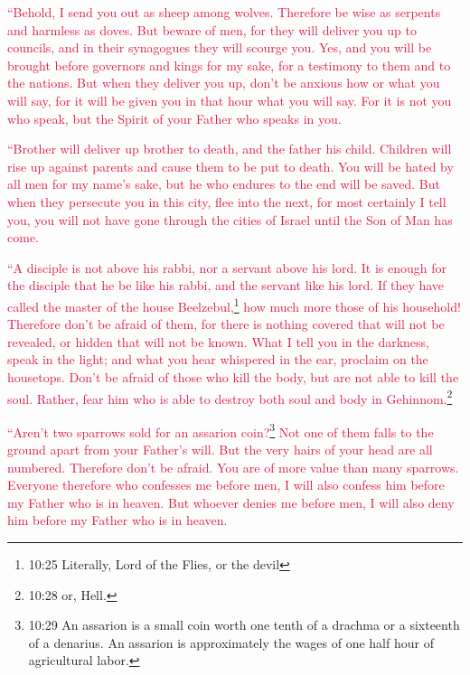 \myverse{}\textcolor{crimson}{“Behold, I send you out as sheep among wolves. Therefore be wise as serpents and harmless as doves.} \myverse{}\textcolor{crimson}{But beware of men, for they will deliver you up to councils, and in their synagogues they will scourge you.} \myverse{}\textcolor{crimson}{Yes, and you will be brought before governors and kings for my sake,
	for a testimony to them and to the nations.
}
\myverse{}\textcolor{crimson}{But when they deliver you up, don’t be anxious how or what you will say,
	for it will be given you in that hour what you will say.
}
\myverse{}\textcolor{crimson}{For it is not you who speak, but the Spirit of your Father who speaks
	in you.}

\myverse{}\textcolor{crimson}{“Brother will deliver up brother to death, and the father
	his child. Children will rise up against parents and cause them to be put to death.
}
\myverse{}\textcolor{crimson}{You will be hated by all men for my name’s sake, but he who endures to
	the end will be saved.
}
\myverse{}\textcolor{crimson}{But when they persecute you in this city, flee into the next, for most
	certainly I tell you, you will not have gone through the cities of Israel until the Son of Man has come.}

\myverse{}\textcolor{crimson}{“A disciple is not above his rabbi, nor a servant above
	his lord.
}
\myverse{}\textcolor{crimson}{It is enough for the disciple that he be like his rabbi, and the servant
	like his lord. If they have called the master of the house Beelzebul,}\footnote{10:25 Literally, Lord of the Flies, or the devil}
\textcolor{crimson}{how much more those of his household!
}
\myverse{}\textcolor{crimson}{Therefore don’t be afraid of them, for there is nothing covered that
	will not be revealed, or hidden that will not be known.
}
\myverse{}\textcolor{crimson}{What I tell you in the darkness, speak in the light; and what you hear
	whispered in the ear, proclaim on the housetops.
}
\myverse{}\textcolor{crimson}{Don’t be afraid of those who kill the body, but are not able to kill
	the soul. Rather, fear him who is able to destroy both soul and body in Gehinnom.}\footnote{10:28 or, Hell.}

\myverse{}\textcolor{crimson}{“Aren’t two sparrows sold for an assarion coin?}\footnote{10:29 An assarion is a small coin worth one tenth of a drachma or a sixteenth of a denarius. An assarion
	is approximately the wages of one half hour of agricultural labor.}
\textcolor{crimson}{Not one of them falls to the ground apart from your Father’s will.
}
\myverse{}\textcolor{crimson}{But the very hairs of your head are all numbered.
}
\myverse{}\textcolor{crimson}{Therefore don’t be afraid. You are of more value than many sparrows.
}
\myverse{}\textcolor{crimson}{Everyone therefore who confesses me before men, I will also confess him
	before my Father who is in heaven.
}
\myverse{}\textcolor{crimson}{But whoever denies me before men, I will also deny him before my Father
	who is in heaven.}

